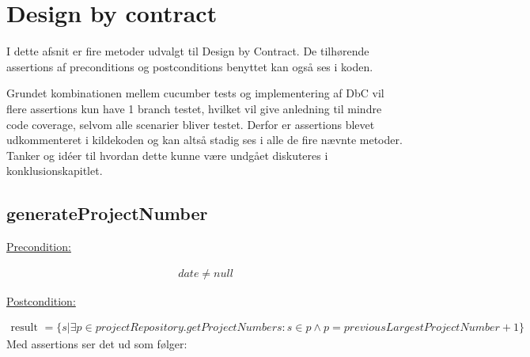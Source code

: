 \section{Design by contract}\label{chap:design_by_contract}

I dette afsnit er fire metoder udvalgt til Design by Contract. De tilhørende assertions af preconditions og postconditions benyttet kan også ses i koden. 

Grundet kombinationen mellem cucumber tests og implementering af DbC vil flere assertions kun have 1 branch testet, hvilket vil give anledning til mindre code coverage, selvom alle scenarier bliver testet. Derfor er assertions blevet udkommenteret i kildekoden og kan altså stadig ses i alle de fire nævnte metoder. Tanker og idéer til hvordan dette kunne være undgået diskuteres i konklusionskapitlet.


\subsection{generateProjectNumber} \label{sec:contract_generate_project_number}
\underline{Precondition:}
\vspace{4pt}

\begin{align}
    date \neq null
\end{align}
\vspace{4pt}

\noindent
\underline{Postcondition:}
\vspace{4pt}

\begin{align}
    \text{result } = \{s|\exists p \in projectRepository.getProjectNumbers : s \in p \land p = previousLargestProjectNumber + 1\}
\end{align}
\newline
\noindent
Med assertions ser det ud som følger:

